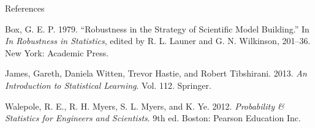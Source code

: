 \documentclass[10pt,ignorenonframetext,]{beamer}
\begin{document}
\begin{frame}{References}
\protect\hypertarget{references}{}

\hypertarget{refs}{}
\leavevmode\hypertarget{ref-box1979}{}%
Box, G. E. P. 1979. ``Robustness in the Strategy of Scientific Model
Building.'' In \emph{In Robustness in Statistics}, edited by R. L.
Launer and G. N. Wilkinson, 201--36. New York: Academic Press.

\leavevmode\hypertarget{ref-ISL}{}%
James, Gareth, Daniela Witten, Trevor Hastie, and Robert Tibshirani.
2013. \emph{An Introduction to Statistical Learning}. Vol. 112.
Springer.

\leavevmode\hypertarget{ref-walepole.etal}{}%
Walepole, R. E., R. H. Myers, S. L. Myers, and K. Ye. 2012.
\emph{Probability \& Statistics for Engineers and Scientists}. 9th ed.
Boston: Pearson Education Inc.

\end{frame}
\end{document}
